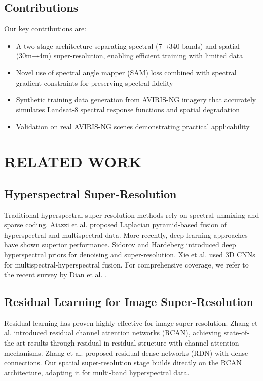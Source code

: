 \documentclass[]{spieman}
\begin{document}
\subsection{Contributions}

Our key contributions are:
\begin{itemize}
\item A two-stage architecture separating spectral (7→340 bands) and spatial (30m→4m) super-resolution, enabling efficient training with limited data
\item Novel use of spectral angle mapper (SAM) loss \cite{kruse1993spectral} combined with spectral gradient constraints for preserving spectral fidelity
\item Synthetic training data generation from AVIRIS-NG imagery that accurately simulates Landsat-8 spectral response functions and spatial degradation
\item Validation on real AVIRIS-NG scenes demonstrating practical applicability
\end{itemize}

\section{RELATED WORK}
\label{sec:related}

\subsection{Hyperspectral Super-Resolution}

Traditional hyperspectral super-resolution methods rely on spectral unmixing \cite{dong2016hyperspectral} and sparse coding. Aiazzi et al. \cite{aiazzi2014hyperspectral} proposed Laplacian pyramid-based fusion of hyperspectral and multispectral data. More recently, deep learning approaches have shown superior performance. Sidorov and Hardeberg \cite{sidorov2019deep} introduced deep hyperspectral priors for denoising and super-resolution. Xie et al. \cite{xie2018multispectral} used 3D CNNs for multispectral-hyperspectral fusion. For comprehensive coverage, we refer to the recent survey by Dian et al. \cite{dian2022survey}.

\subsection{Residual Learning for Image Super-Resolution}

Residual learning has proven highly effective for image super-resolution. Zhang et al. \cite{zhang2018rcan} introduced residual channel attention networks (RCAN), achieving state-of-the-art results through residual-in-residual structure with channel attention mechanisms. Zhang et al. \cite{zhang2018rdn} proposed residual dense networks (RDN) with dense connections. Our spatial super-resolution stage builds directly on the RCAN architecture, adapting it for multi-band hyperspectral data.
\end{document}
